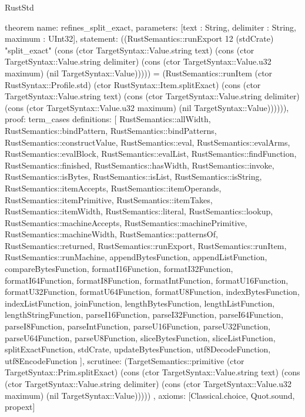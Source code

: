 \begin{lexlean}{RustStd}
\begin{semanticmodule}
theorem{
  name: refines_split_exact,
  parameters: [text : String, delimiter : String, maximum : UInt32],
  statement: ((RustSemantics::runExport 12 (stdCrate) "split_exact" (cons (ctor TargetSyntax::Value.string text) (cons (ctor TargetSyntax::Value.string delimiter) (cons (ctor TargetSyntax::Value.u32 maximum) (nil TargetSyntax::Value))))) = (RustSemantics::runItem (ctor RustSyntax::Profile.std) (ctor RustSyntax::Item.splitExact) (cons (ctor TargetSyntax::Value.string text) (cons (ctor TargetSyntax::Value.string delimiter) (cons (ctor TargetSyntax::Value.u32 maximum) (nil TargetSyntax::Value)))))),
  proof: term_cases{
    definitions: [
      RustSemantics::allWidth,
      RustSemantics::bindPattern,
      RustSemantics::bindPatterns,
      RustSemantics::constructValue,
      RustSemantics::eval,
      RustSemantics::evalArms,
      RustSemantics::evalBlock,
      RustSemantics::evalList,
      RustSemantics::findFunction,
      RustSemantics::finished,
      RustSemantics::hasWidth,
      RustSemantics::invoke,
      RustSemantics::isBytes,
      RustSemantics::isList,
      RustSemantics::isString,
      RustSemantics::itemAccepts,
      RustSemantics::itemOperands,
      RustSemantics::itemPrimitive,
      RustSemantics::itemTakes,
      RustSemantics::itemWidth,
      RustSemantics::literal,
      RustSemantics::lookup,
      RustSemantics::machineAccepts,
      RustSemantics::machinePrimitive,
      RustSemantics::machineWidth,
      RustSemantics::patternsOf,
      RustSemantics::returned,
      RustSemantics::runExport,
      RustSemantics::runItem,
      RustSemantics::runMachine,
      appendBytesFunction,
      appendListFunction,
      compareBytesFunction,
      formatI16Function,
      formatI32Function,
      formatI64Function,
      formatI8Function,
      formatIntFunction,
      formatU16Function,
      formatU32Function,
      formatU64Function,
      formatU8Function,
      indexBytesFunction,
      indexListFunction,
      joinFunction,
      lengthBytesFunction,
      lengthListFunction,
      lengthStringFunction,
      parseI16Function,
      parseI32Function,
      parseI64Function,
      parseI8Function,
      parseIntFunction,
      parseU16Function,
      parseU32Function,
      parseU64Function,
      parseU8Function,
      sliceBytesFunction,
      sliceListFunction,
      splitExactFunction,
      stdCrate,
      updateBytesFunction,
      utf8DecodeFunction,
      utf8EncodeFunction
    ],
    scrutinee: (TargetSemantics::primitive (ctor TargetSyntax::Prim.splitExact) (cons (ctor TargetSyntax::Value.string text) (cons (ctor TargetSyntax::Value.string delimiter) (cons (ctor TargetSyntax::Value.u32 maximum) (nil TargetSyntax::Value)))))
  },
  axioms: [Classical.choice, Quot.sound, propext]
}


\end{semanticmodule}
\end{lexlean}
